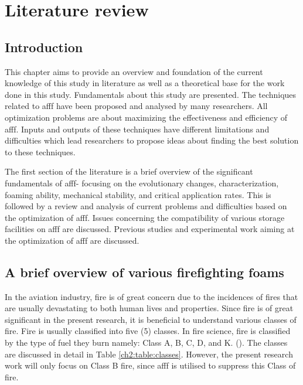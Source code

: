 \chapter{Literature review}
\section{Introduction}
This chapter aims to provide an overview and foundation of the current knowledge of this study in literature as well as a theoretical base for the work done in this study. Fundamentals about this study are presented. The techniques related to \acrshort{afff} have been proposed and analysed by many researchers. All optimization problems are about maximizing the effectiveness and efficiency of \acrshort{afff}. Inputs and outputs of these techniques have different limitations and difficulties which lead researchers to propose ideas about finding the best solution to these techniques.  

The first section of the literature is a brief overview of the significant fundamentals of \acrshort{afff}- focusing on the evolutionary changes, characterization, foaming ability, mechanical stability, and critical application rates. This is followed by a review and analysis of current problems and difficulties based on the optimization of \acrshort{afff}. Issues concerning the compatibility of various storage facilities on \acrshort{afff} are discussed. Previous studies and experimental work aiming at the optimization of \acrshort{afff} are discussed. 

\section{A brief overview of various firefighting foams}
In the aviation industry, fire is of great concern due to the incidences of fires that are usually devastating to both human lives and properties. Since fire is of great significant in the present research, it is beneficial to understand various classes of fire. Fire is usually classified into five (5) classes. In fire science, fire is classified by the type of fuel they burn namely: Class A, B, C, D, and K. (\cite{oguike2013study}).  The classes are discussed in detail in Table \ref{ch2:table:classes}. However, the present research work will only focus on Class B fire, since \acrshort{afff} is utilised to suppress this Class of fire.

